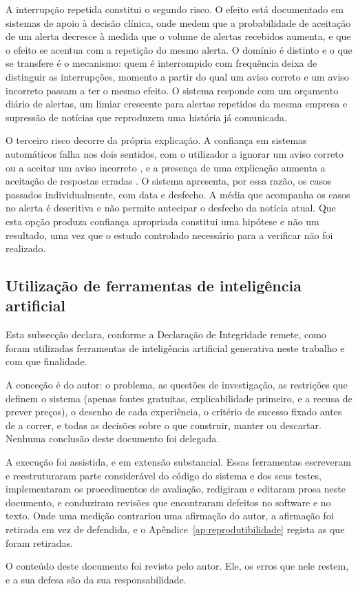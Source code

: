 A interrupção repetida constitui o segundo risco. O efeito está documentado em sistemas de apoio à
decisão clínica, onde \textcite{ancker2017alertfatigue} medem que a probabilidade de aceitação de um
alerta decresce à medida que o volume de alertas recebidos aumenta, e que o efeito se acentua com a
repetição do mesmo alerta. O domínio é distinto e o que se transfere é o mecanismo: quem é
interrompido com frequência deixa de distinguir as interrupções, momento a partir do qual um aviso
correto e um aviso incorreto passam a ter o mesmo efeito. O sistema responde com um orçamento
diário de alertas, um limiar crescente para alertas repetidos da mesma empresa e supressão de
notícias que reproduzem uma história já comunicada.

O terceiro risco decorre da própria explicação. A confiança em sistemas automáticos falha nos dois
sentidos, com o utilizador a ignorar um aviso correto ou a aceitar um aviso incorreto
\autocite{lee2004trust}, e a presença de uma explicação aumenta a aceitação de respostas erradas
\autocite{bansal2021whole}. O sistema apresenta, por essa razão, os casos passados individualmente,
com data e desfecho. A média que acompanha os casos no alerta é descritiva e não permite antecipar
o desfecho da notícia atual. Que
esta opção produza confiança apropriada constitui uma hipótese e não um resultado, uma vez que o
estudo controlado necessário para a verificar não foi realizado.


\subsection{Utilização de ferramentas de inteligência artificial}
\label{sec:met_ia}

Esta subsecção declara, conforme a Declaração de Integridade remete, como foram utilizadas
ferramentas de inteligência artificial generativa neste trabalho e com que finalidade.

A conceção é do autor: o problema, as questões de investigação, as restrições que definem o
sistema (apenas fontes gratuitas, explicabilidade primeiro, e a recusa de prever preços), o
desenho de cada experiência, o critério de sucesso fixado antes de a correr, e todas as decisões
sobre o que construir, manter ou descartar. Nenhuma conclusão deste documento foi delegada.

A execução foi assistida, e em extensão substancial. Essas ferramentas escreveram e reestruturaram
parte considerável do código do sistema e dos seus testes, implementaram os procedimentos de
avaliação, redigiram e editaram prosa neste documento, e conduziram revisões que encontraram
defeitos no software e no texto. Onde uma medição contrariou uma afirmação do autor, a afirmação
foi retirada em vez de defendida, e o Apêndice~\ref{ap:reprodutibilidade} regista as que foram
retiradas.

O conteúdo deste documento foi revisto pelo autor. Ele, os erros que nele restem, e a sua defesa
são da sua responsabilidade.
